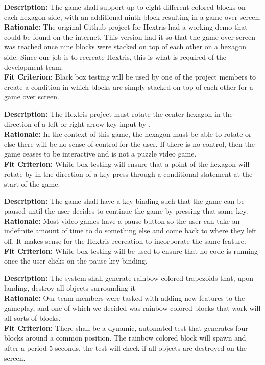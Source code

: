 \documentclass[12pt, titlepage]{article}
\begin{document}
\begin{enumerate}[label=F\arabic*]
\item \textbf{Description:} The game shall support up to eight different colored blocks on each hexagon side, with an additional ninth block resulting in a game over screen. \\
\textbf{Rationale:} The original Github project for Hextris had a working demo that could be found on the internet. This version had it so that the game over screen was reached once nine blocks were stacked on top of each other on a hexagon side. Since our job is to recreate Hextris, this is what is required of the development team. \\
\textbf{Fit Criterion:} Black box testing will be used by one of the project members to create a condition in which blocks are simply stacked on top of each other for a game over screen. 

\item \textbf{Description:} The Hextris project must rotate the center hexagon in the direction of a left or right arrow key input by \textepsilon. \\
\textbf{Rationale:} In the context of this game, the hexagon must be able to rotate or else there will be no sense of control for the user. If there is no control, then the game ceases to be interactive and is not a puzzle video game. \\
\textbf{Fit Criterion:} White box testing will ensure that a point of the hexagon will rotate by \textepsilon \space in the direction of a key press through a conditional statement at the start of the game. 

\item \textbf{Description:} The game shall have a key binding such that the game can be paused until the user decides to continue the game by pressing that same key.\\
\textbf{Rationale:} Most video games have a pause button so the user can take an indefinite amount of time to do something else and come back to where they left off. It makes sense for the Hextris recreation to incorporate the same feature. \\
\textbf{Fit Criterion:} White box testing will be used to ensure that no code is running once the user clicks on the pause key binding. 

{\color{blue} %
\item \textbf{Description:} The system shall generate rainbow colored trapezoids that, upon landing, destroy all objects surrounding it\\
\textbf{Rationale:} Our team members were tasked with adding new features to the gameplay, and one of which we decided was rainbow colored blocks that work will all sorts of blocks.\\
\textbf{Fit Criterion:} There shall be a dynamic, automated test that generates four blocks around a common position. The rainbow colored block will spawn and after a period 5 seconds, the test will check if all objects are destroyed on the screen.

}
\end{enumerate}
\end{document}
